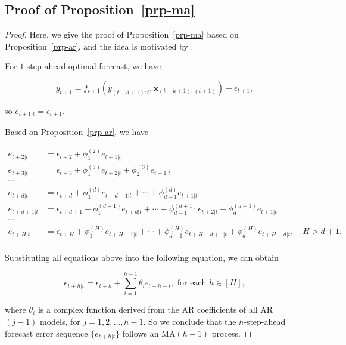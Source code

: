 \documentclass[
  11pt,
  a4paper,
]{article}
\theoremstyle{plain}
\theoremstyle{plain}
\theoremstyle{remark}
\begin{document}
\subsection{\texorpdfstring{Proof of
Proposition~\ref{prp-ma}}{Proof of Proposition~}}\label{sec-proof_ma}

\begin{proof}
Here, we give the proof of Proposition~\ref{prp-ma} based on
Proposition~\ref{prp-ar}, and the idea is motivated by
\textcite{sommer2023}.

For \(1\)-step-ahead optimal forecast, we have

\[
y_{t+1} = f_{t+1}(y_{(t-d+1):t},\bm{x}_{(t-k+1):(t+1)}) + \epsilon_{t+1},
\]

so \(e_{t+1|t}=\epsilon_{t+1}\).

Based on Proposition~\ref{prp-ar}, we have

\[
\begin{aligned}
e_{t+2|t} &= \epsilon_{t+2} + \phi_{1}^{(2)}e_{t+1|t} \\
e_{t+3|t} &= \epsilon_{t+3} + \phi_{1}^{(3)}e_{t+2|t} + \phi_{2}^{(3)}e_{t+1|t} \\
\cdots \\
e_{t+d|t} &= \epsilon_{t+d} + \phi_{1}^{(d)}e_{t+d-1|t} + \cdots + \phi_{d-1}^{(d)}e_{t+1|t} \\
e_{t+d+1|t} &= \epsilon_{t+d+1} + \phi_{1}^{(d+1)}e_{t+d|t} + \cdots + \phi_{d-1}^{(d+1)}e_{t+2|t} + \phi_{d}^{(d+1)}e_{t+1|t} \\
\cdots \\
e_{t+H|t} &= \epsilon_{t+H} + \phi_{1}^{(H)}e_{t+H-1|t} + \cdots + \phi_{d-1}^{(H)}e_{t+H-d+1|t} + \phi_{d}^{(H)}e_{t+H-d|t}, \quad H > d + 1. \\
\end{aligned}
\]

Substituting all equations above into the following equation, we can
obtain

\[
e_{t+h|t} = \epsilon_{t+h} + \sum_{i=1}^{h-1}\theta_{i}\epsilon_{t+h-i}, \text{ for each } h\in[H],
\]

where \(\theta_{i}\) is a complex function derived from the AR
coefficients of all AR\((j-1)\) models, for \(j = 1,2,\ldots,h-1\). So
we conclude that the \(h\)-step-ahead forecast error sequence
\(\{e_{t+h|t}\}\) follows an MA\((h-1)\) process.
\end{proof}
\end{document}
